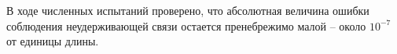 В ходе численных испытаний проверено, что абсолютная величина ошибки соблюдения неудерживающей связи 
остается пренебрежимо малой -- около $10^{-7}$ от единицы длины.

%
%
%
%
%




